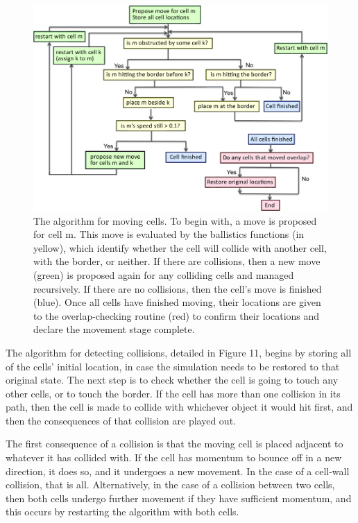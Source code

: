 \documentclass[12pt]{article}
\begin{document}
\begin{figure}[H]
\centering
\includegraphics[width=\textwidth]{media/algorithm.png}
\caption{The algorithm for moving cells. To begin with, a move is proposed
for cell m. This move is evaluated by the ballistics functions (in yellow),
which identify whether the cell will collide with another cell, with 
the border, or neither. If there are collisions, then a new move (green) is 
proposed again for any colliding cells and managed recursively. If there
are no collisions, then the cell's move is finished (blue). Once all cells
have finished moving, their locations are given to the overlap-checking routine 
(red) to confirm their locations and declare the movement stage complete.}
\end{figure}

The algorithm for detecting collisions, detailed in Figure 11, begins by storing all of the 
cells' initial location, in case the simulation needs to be restored to 
that original state. The next step is to check 
whether the cell is going to touch any other cells, or to touch the 
border. If the cell has more than one collision in its path, then the 
cell is made to collide with whichever object it would hit first, and 
then the consequences of that collision are played out. 

The first consequence of a collision is that the moving cell is placed 
adjacent to whatever it has collided with. If the cell has momentum to 
bounce off in a new direction, it does so, and it undergoes a new 
movement. In the case of a cell-wall collision, that is all. 
Alternatively, in the case of a collision between two cells, then both 
cells undergo further movement if they have sufficient momentum, and 
this occurs by restarting the algorithm with both cells.
\end{document}
